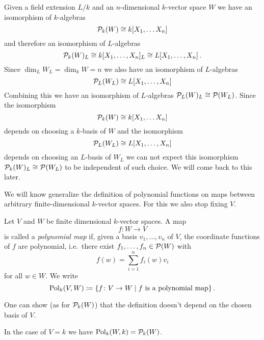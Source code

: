 Given a field extension $L/k$ and an $n$-dimensional $k$-vector space $W$ we have an isomorphism of $k$-algebras
\[
        \mathcal{P}_k(W)
  \cong k[X_1, \dotsc X_n]
\]
and therefore an isomorphism of $L$-algebras
\[
        \mathcal{P}_k(W)_L
  \cong k[X_1, \dotsc, X_n]_L
  \cong L[X_1, \dotsc, X_n] \,.
\]
Since $\dim_L W_L = \dim_k W = n$ we also have an isomorphism of $L$-algebras
\[
        \mathcal{P}_L(W_L)
  \cong L[X_1, \dotsc, X_n]
\]
Combining this we have an isomorphism of $L$-algebras $\mathcal{P}_L(W)_L \cong \mathcal{P}(W_L)$. Since the isomorphism
\[
        \mathcal{P}_k(W)
  \cong k[X_1, \dotsc X_n]
\]
depends on choosing a $k$-basis of $W$ and the isomorphism
\[
        \mathcal{P}_L(W_L)
  \cong L[X_1, \dotsc, X_n]
\]
depends on choosing an $L$-basis of $W_L$ we can not expect this isomorphism $\mathcal{P}_k(W)_L \cong \mathcal{P}(W_L)$ to be independent of such choice.
We will come back to this later.


We will know generalize the definition of polynomial functions on maps between arbitrary finite-dimensional $k$-vector spaces.
For this we also stop fixing $V$.


\begin{defi}
  Let $V$ and $W$ be finite dimensional $k$-vector spaces. A map
  \[
            f
    \colon  W
    \to     V
  \]
  is called a \emph{polynomial map} if, given a basis $v_1, \dotsc, v_n$ of $V$, the coordinate functions of $f$ are polynomial, i.e.\ there exist $f_1, \dotsc, f_n \in \mathcal{P}(W)$ with
  \[
      f(w)
    = \sum_{i=1}^n f_i(w) v_i
  \]
  for all $w \in W$.
  We write
  \[
              \operatorname{Pol}_k(V,W)
    \coloneqq \{
                        f
                \colon  V
                \to     W
              \mid
                f \text{ is a polynomial map}
              \} \,.
  \]
\end{defi}


\begin{rem}
  One can show (as for $\mathcal{P}_k(W)$) that the definition doesn’t depend on the chosen basis of $V$.
\end{rem}


\begin{rem}
  In the case of $V = k$ we have $\operatorname{Pol}_k(W,k) = \mathcal{P}_k(W)$.
\end{rem}



